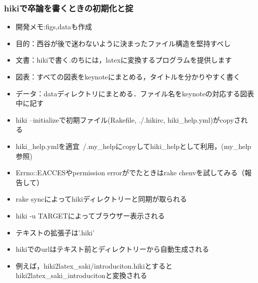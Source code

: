 \subsubsection{hikiで卒論を書くときの初期化と掟}\begin{itemize}
\item 開発メモ:figs,dataも作成
\item 目的：西谷が後で迷わないように決まったファイル構造を堅持すべし
\item 文書：hikiで書く.のちには，latexに変換するプログラムを提供します
\item 図表：すべての図表をkeynoteにまとめる，タイトルを分かりやすく書く
\item データ：dataディレクトリにまとめる．ファイル名をkeynoteの対応する図表中に記す
\item hiki --initializeで初期ファイル(Rakefile, ./.hikirc, hiki\_help.yml)がcopyされる
\item hiki\_help.ymlを適宜~/.my\_helpにcopyしてhiki\_helpとして利用，(my\_help参照)
\item Errno::EACCESやpermission errorがでたときはrake chenvを試してみる（報告して）
\item rake syncによってhikiディレクトリーと同期が取られる
\item hiki -u TARGETによってブラウザー表示される
\item テキストの拡張子は'.hiki'
\item hikiでのurlはテキスト前とディレクトリーから自動生成される
\item 例えば，hiki2latex\_saki/introduciton.hikiとするとhiki2latex\_saki\_introducitonと変換される
\end{itemize}
